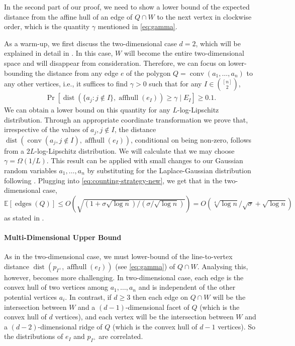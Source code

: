 \documentclass{theoretics}
\newcommand{\E}{\mathbb E}
\newcommand{\aff}{\operatorname{affhull}}
\newcommand{\conv}{\operatorname{conv}}
\newcommand{\edges}{\operatorname{edges}}
\newcommand{\dist}{\operatorname{dist}}
\begin{document}
In the second part of our proof, we need to show a lower bound of the expected
distance from the affine hull of an edge of $Q \cap W$ to the next vertex in clockwise order,
which is the quantity $\gamma$ mentioned in \eqref{eq:gamma}. 

As a warm-up, we first discuss the two-dimensional case $d=2$, which will be explained in detail in .
In this case, $W$ will become the entire two-dimensional space and will disappear from consideration. 
Therefore, we can focus on lower-bounding the distance from any edge $e$ of the polygon $Q = \conv(a_1, \ldots, a_n)$ to any other vertices, i.e., it suffices to find $\gamma > 0$ such that for any $I \in \binom{[n]}{2}$,
\begin{align*}
    \Pr[ \dist(\{a_j : j \notin I\}, \aff(e_I)) \geq \gamma \mid E_I] \geq 0.1.
\end{align*}
We can obtain a lower bound on this quantity for any $L$-log-Lipschitz distribution.
Through an appropriate coordinate transformation we prove that,
irrespective of the values of $a_j, j \notin I$,
the distance $\dist(\conv(a_j, j \notin I), \aff(e_I))$, conditional on being non-zero,
follows from a $2L$-log-Lipschitz distribution.
We will calculate that we may choose $\gamma = \Omega(1/L)$.
This result can be applied with small changes to our Gaussian random variables $a_1, \ldots, a_n$
by substituting for the Laplace-Gaussian distribution following \cite{DH18}.
Plugging into \eqref{eq:counting-strategy-new}, we get that in the
two-dimensional case,
$\E[\edges(Q)] \leq O(\sqrt{(1+\sigma\sqrt{\log n})/(\sigma/\sqrt{\log n})}) = O(\sqrt[4]{\log n} / \sqrt{\sigma} + \sqrt{ \log n})$
as stated in .



\paragraph{Multi-Dimensional Upper Bound}

As in the two-dimensional case, we must lower-bound of the line-to-vertex distance $\dist(p_{I^+}, \aff(e_I))$ (see \eqref{eq:gamma}) of $Q \cap W$.
Analysing this, however, becomes more challenging.
In two-dimensional case, each edge is the convex hull of two vertices among $a_1, \ldots, a_n$ and is independent of the other potential vertices $a_i$. 
In contrast, if $d \geq 3$ then each edge on $Q \cap W$ will be the intersection between $W$ and a $(d-1)$-dimensional facet of $Q$ (which is the convex hull of $d$ vertices), and each vertex will be the intersection between $W$ and a $(d-2)$-dimensional ridge of $Q$ (which is the convex hull of $d-1$ vertices). 
So the distributions of $e_I$ and $p_{I^+}$ are correlated.
\end{document}
